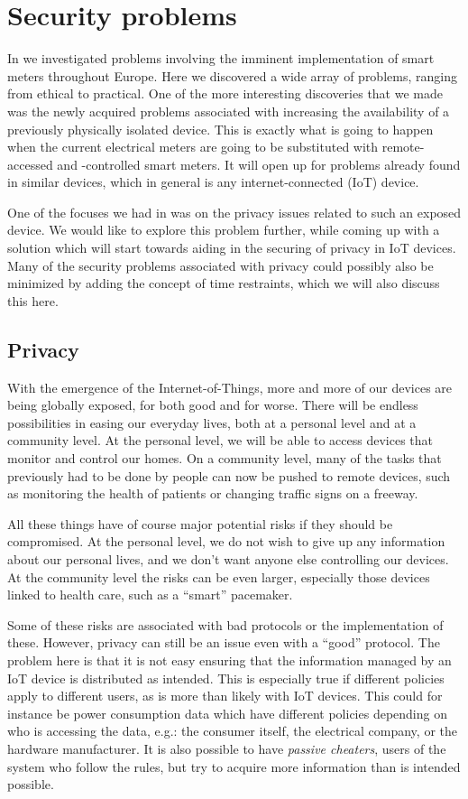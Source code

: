
\section{Security problems}
In \cite{prespecialization} we investigated problems involving the imminent implementation of smart meters throughout Europe.
Here we discovered a wide array of problems, ranging from ethical to practical.
One of the more interesting discoveries that we made was the newly acquired problems associated with increasing the availability of a previously physically isolated device.
This is exactly what is going to happen when the current electrical meters are going to be substituted with remote-accessed and -controlled smart meters.
It will open up for problems already found in similar devices, which in general is any internet-connected (IoT) device.

One of the focuses we had in \cite{prespecialization} was on the privacy issues related to such an exposed device.
We would like to explore this problem further, while coming up with a solution which will start towards aiding in the securing of privacy in IoT devices.
Many of the security problems associated with privacy could possibly also be minimized by adding the concept of time restraints, which we will also discuss this here.

\subsection{Privacy}
With the emergence of the Internet-of-Things, more and more of our devices are being globally exposed, for both good and for worse.
There will be endless possibilities in easing our everyday lives, both at a personal level and at a community level.
At the personal level, we will be able to access devices that monitor and control our homes.
On a community level, many of the tasks that previously had to be done by people can now be pushed to remote devices, such as monitoring the health of patients or changing traffic signs on a freeway.

All these things have of course major potential risks if they should be compromised.
At the personal level, we do not wish to give up any information about our personal lives, and we don't want anyone else controlling our devices.
At the community level the risks can be even larger, especially those devices linked to health care, such as a ``smart'' pacemaker.

Some of these risks are associated with bad protocols or the implementation of these.
However, privacy can still be an issue even with a ``good'' protocol.
The problem here is that it is not easy ensuring that the information managed by an IoT device is distributed as intended.
This is especially true if different policies apply to different users, as is more than likely with IoT devices.
This could for instance be power consumption data which have different policies depending on who is accessing the data, e.g.: the consumer itself, the electrical company, or the hardware manufacturer.
It is also possible to have \emph{passive cheaters}, users of the system who follow the rules, but try to acquire more information than is intended possible.

